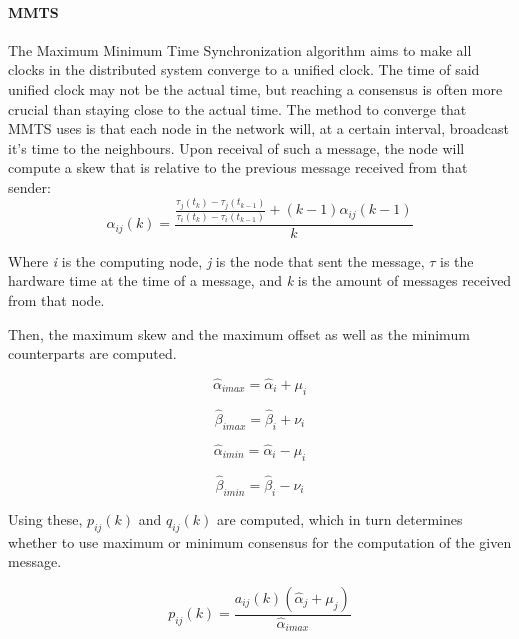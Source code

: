 \documentclass[a4paper,12pt]{article}
\begin{document}
    \paragraph{MMTS} The Maximum Minimum Time Synchronization algorithm aims to make all clocks in the distributed system converge to a unified clock. The time of said unified clock may not be the actual time, but reaching a consensus is often more crucial than staying close to the actual time.
    The method to converge that MMTS uses is that each node in the network will, at a certain interval, broadcast it's time to the neighbours. Upon receival of such a message, the node will compute a skew that is relative to the previous message received from that sender:
    \begin{equation}
        \alpha_{ij}(k) = \frac{\frac{\tau_j(t_k) - \tau_j(t_{k-1})}{\tau_i(t_k)-\tau_i(t_{k-1})} + (k-1)\alpha_{ij}(k-1)}{k}
    \end{equation}

    Where \textit{i} is the computing node, \textit{j} is the node that sent the message, \textit{$\tau$} is the hardware time at the time of a message, and \textit{k} is the amount of messages received from that node.
    
    Then, the maximum skew and the maximum offset as well as the minimum counterparts are computed.
    
    \begin{equation}
        \hat{\alpha}_{imax} = \hat{\alpha}_i + \mu_i
    \end{equation}
    
    \begin{equation}
        \hat{\beta}_{imax} = \hat{\beta}_i + \nu_i
    \end{equation}
    
    \begin{equation}
        \hat{\alpha}_{imin} = \hat{\alpha}_i - \mu_i
    \end{equation}
    
    \begin{equation}
        \hat{\beta}_{imin} = \hat{\beta}_i - \nu_i
    \end{equation}
    
    Using these, $p_{ij}(k)$ and $q_{ij}(k)$ are computed, which in turn determines whether to use maximum or minimum consensus for the computation of the given message.
    
    \begin{equation}
        p_{ij}(k) = \frac{a_{ij}(k)(\hat{\alpha}_j + \mu_j)}{\hat{\alpha}_{imax}}
    \end{equation}
    
\end{document}
